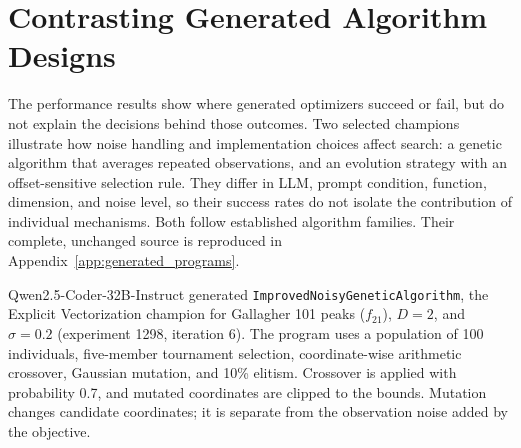 


\section{Contrasting Generated Algorithm Designs}
\label{sec:generated_program_cases}

The performance results show where generated optimizers succeed or
fail, but do not explain the decisions behind those outcomes. Two
selected champions illustrate how noise handling and implementation
choices affect search: a genetic algorithm that averages repeated
observations, and an evolution strategy with an offset-sensitive
selection rule. They differ in LLM, prompt condition, function,
dimension, and noise level, so their success rates do not isolate
the contribution of individual mechanisms. Both follow established
algorithm families. Their complete, unchanged source is reproduced
in Appendix~\ref{app:generated_programs}.

Qwen2.5-Coder-32B-Instruct generated
\texttt{ImprovedNoisyGeneticAlgorithm}, the Explicit Vectorization
champion for Gallagher 101 peaks ($f_{21}$), $D=2$, and $\sigma=0.2$
(experiment 1298, iteration 6). The program uses a population of
100 individuals, five-member tournament selection, coordinate-wise
arithmetic crossover, Gaussian mutation, and 10\% elitism.
Crossover is applied with probability 0.7, and mutated coordinates
are clipped to the bounds. Mutation changes candidate coordinates;
it is separate from the observation noise added by the objective.

